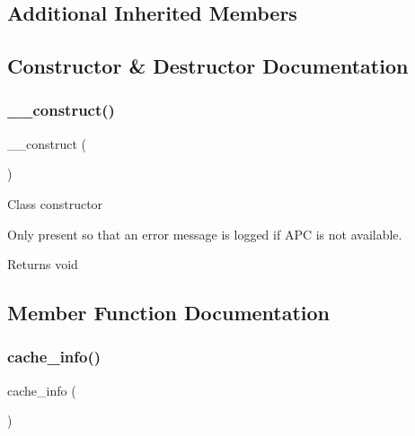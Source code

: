\subsection*{Additional Inherited Members}


\subsection{Constructor \& Destructor Documentation}
\mbox{\label{class_c_i___cache__wincache_a095c5d389db211932136b53f25f39685}} 
\subsubsection{\texorpdfstring{\+\_\+\+\_\+construct()}{\_\_construct()}}
{\footnotesize\ttfamily \+\_\+\+\_\+construct (\begin{DoxyParamCaption}{ }\end{DoxyParamCaption})}

Class constructor

Only present so that an error message is logged if A\+PC is not available.

\begin{DoxyReturn}{Returns}
void 
\end{DoxyReturn}


\subsection{Member Function Documentation}
\mbox{\label{class_c_i___cache__wincache_acb4742926a6fa901e4f0917e1a35ef4c}} 
\subsubsection{\texorpdfstring{cache\+\_\+info()}{cache\_info()}}
{\footnotesize\ttfamily cache\+\_\+info (\begin{DoxyParamCaption}{ }\end{DoxyParamCaption})}

